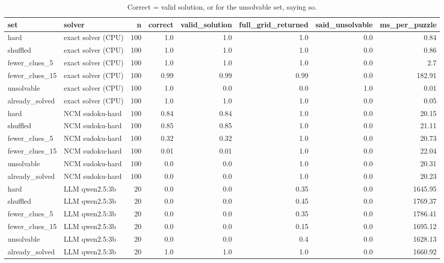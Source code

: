 \begin{table}[t]
\centering\small
\caption{Correct = valid solution, or for the unsolvable set, saying so.}
\label{tab:sudoku_stress}
\begin{tabular}{llrrrrrr}
\toprule
set & solver & n & correct & valid\_solution & full\_grid\_returned & said\_unsolvable & ms\_per\_puzzle \\
\midrule
hard & exact solver (CPU) & 100 & 1.0 & 1.0 & 1.0 & 0.0 & 0.84 \\
shuffled & exact solver (CPU) & 100 & 1.0 & 1.0 & 1.0 & 0.0 & 0.86 \\
fewer\_clues\_5 & exact solver (CPU) & 100 & 1.0 & 1.0 & 1.0 & 0.0 & 2.7 \\
fewer\_clues\_15 & exact solver (CPU) & 100 & 0.99 & 0.99 & 0.99 & 0.0 & 182.91 \\
unsolvable & exact solver (CPU) & 100 & 1.0 & 0.0 & 0.0 & 1.0 & 0.01 \\
already\_solved & exact solver (CPU) & 100 & 1.0 & 1.0 & 1.0 & 0.0 & 0.05 \\
hard & NCM sudoku-hard & 100 & 0.84 & 0.84 & 1.0 & 0.0 & 20.15 \\
shuffled & NCM sudoku-hard & 100 & 0.85 & 0.85 & 1.0 & 0.0 & 21.11 \\
fewer\_clues\_5 & NCM sudoku-hard & 100 & 0.32 & 0.32 & 1.0 & 0.0 & 20.73 \\
fewer\_clues\_15 & NCM sudoku-hard & 100 & 0.01 & 0.01 & 1.0 & 0.0 & 22.04 \\
unsolvable & NCM sudoku-hard & 100 & 0.0 & 0.0 & 1.0 & 0.0 & 20.31 \\
already\_solved & NCM sudoku-hard & 100 & 0.0 & 0.0 & 1.0 & 0.0 & 20.23 \\
hard & LLM qwen2.5:3b & 20 & 0.0 & 0.0 & 0.35 & 0.0 & 1645.95 \\
shuffled & LLM qwen2.5:3b & 20 & 0.0 & 0.0 & 0.45 & 0.0 & 1769.37 \\
fewer\_clues\_5 & LLM qwen2.5:3b & 20 & 0.0 & 0.0 & 0.35 & 0.0 & 1786.41 \\
fewer\_clues\_15 & LLM qwen2.5:3b & 20 & 0.0 & 0.0 & 0.15 & 0.0 & 1695.12 \\
unsolvable & LLM qwen2.5:3b & 20 & 0.0 & 0.0 & 0.4 & 0.0 & 1628.13 \\
already\_solved & LLM qwen2.5:3b & 20 & 1.0 & 1.0 & 1.0 & 0.0 & 1660.92 \\
\bottomrule
\end{tabular}
\end{table}
